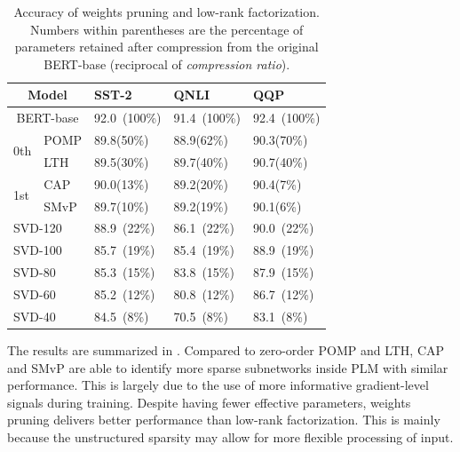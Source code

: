 \begin{table}[h]
	\centering
	\scriptsize
	\begin{tabular}{|l|l|lll|}
\hline
		\multicolumn{2}{|c|}{Model}                          & SST-2       & QNLI          & QQP           \\
\hline
		\multicolumn{2}{|c|}{BERT-base}                           & 92.0~(100\%)        & 91.4~(100\%)          & 92.4~(100\%)          \\
\hline
		\multirow{2}{*}{0th}                      & POMP & 89.8(50\%) & 88.9(62\%) & 90.3(70\%) \\
		& LTH  & 89.5(30\%) & 89.7(40\%)   & 90.7(40\%)   \\
\hline
		\multirow{2}{*}{1st} & CAP  & 90.0(13\%) & 89.2(20\%)   & 90.4(7\%)   \\
		& SMvP & 89.7(10\%) & 89.2(19\%)   & 90.1(6\%)  \\
\hline
		\multicolumn{2}{|l|}{SVD-120} & 88.9~(22\%)      &86.1~(22\%)      & 90.0~(22\%)       \\
		\multicolumn{2}{|l|}{SVD-100}  & 85.7~(19\%)      & 85.4~(19\%)     & 88.9~(19\%)       \\
		\multicolumn{2}{|l|}{SVD-80}  &85.3~(15\%)       & 83.8~(15\%)     &87.9~(15\%)        \\
		\multicolumn{2}{|l|}{SVD-60}  & 85.2~(12\%)      &  80.8~(12\%)    & 86.7~(12\%)       \\
		\multicolumn{2}{|l|}{SVD-40}  &  84.5~(8\%)     &  70.5~(8\%)    &  83.1~(8\%)      \\
\hline
	\end{tabular}
	\caption{Accuracy of weights pruning and low-rank 
		factorization.
		Numbers within parentheses are the percentage of parameters retained after 
		compression from the original BERT-base (reciprocal of \textit{compression ratio}).}
	\label{table:pilot}
\end{table}
The results are summarized in . Compared to zero-order POMP and LTH, CAP and SMvP are able to identify more sparse subnetworks inside PLM with similar performance. This is largely due to the use of more informative gradient-level signals during training. Despite having fewer effective parameters, weights pruning delivers better performance than low-rank factorization. This is mainly because the unstructured sparsity may allow for more flexible processing of input.

